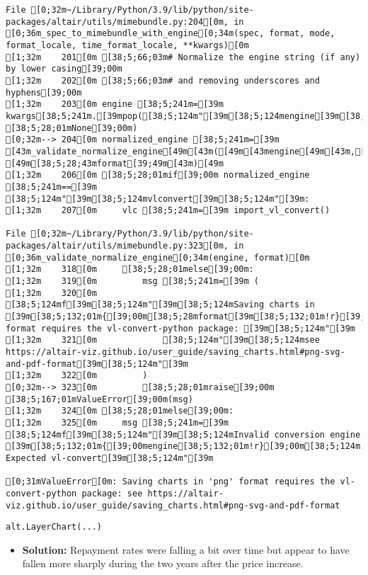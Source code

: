 \documentclass[
  letterpaper,
  DIV=11,
  numbers=noendperiod]{scrartcl}
\providecommand{\tightlist}{%
  \setlength{\itemsep}{0pt}\setlength{\parskip}{0pt}}\usepackage{longtable,booktabs,array}
\begin{document}
\begin{verbatim}
File [0;32m~/Library/Python/3.9/lib/python/site-packages/altair/utils/mimebundle.py:204[0m, in [0;36m_spec_to_mimebundle_with_engine[0;34m(spec, format, mode, format_locale, time_format_locale, **kwargs)[0m
[1;32m    201[0m [38;5;66;03m# Normalize the engine string (if any) by lower casing[39;00m
[1;32m    202[0m [38;5;66;03m# and removing underscores and hyphens[39;00m
[1;32m    203[0m engine [38;5;241m=[39m kwargs[38;5;241m.[39mpop([38;5;124m"[39m[38;5;124mengine[39m[38;5;124m"[39m, [38;5;28;01mNone[39;00m)
[0;32m--> 204[0m normalized_engine [38;5;241m=[39m [43m_validate_normalize_engine[49m[43m([49m[43mengine[49m[43m,[49m[43m [49m[38;5;28;43mformat[39;49m[43m)[49m
[1;32m    206[0m [38;5;28;01mif[39;00m normalized_engine [38;5;241m==[39m [38;5;124m"[39m[38;5;124mvlconvert[39m[38;5;124m"[39m:
[1;32m    207[0m     vlc [38;5;241m=[39m import_vl_convert()

File [0;32m~/Library/Python/3.9/lib/python/site-packages/altair/utils/mimebundle.py:323[0m, in [0;36m_validate_normalize_engine[0;34m(engine, format)[0m
[1;32m    318[0m     [38;5;28;01melse[39;00m:
[1;32m    319[0m         msg [38;5;241m=[39m (
[1;32m    320[0m             [38;5;124mf[39m[38;5;124m"[39m[38;5;124mSaving charts in [39m[38;5;132;01m{[39;00m[38;5;28mformat[39m[38;5;132;01m!r}[39;00m[38;5;124m format requires the vl-convert-python package: [39m[38;5;124m"[39m
[1;32m    321[0m             [38;5;124m"[39m[38;5;124msee https://altair-viz.github.io/user_guide/saving_charts.html#png-svg-and-pdf-format[39m[38;5;124m"[39m
[1;32m    322[0m         )
[0;32m--> 323[0m         [38;5;28;01mraise[39;00m [38;5;167;01mValueError[39;00m(msg)
[1;32m    324[0m [38;5;28;01melse[39;00m:
[1;32m    325[0m     msg [38;5;241m=[39m [38;5;124mf[39m[38;5;124m"[39m[38;5;124mInvalid conversion engine [39m[38;5;132;01m{[39;00mengine[38;5;132;01m!r}[39;00m[38;5;124m. Expected vl-convert[39m[38;5;124m"[39m

[0;31mValueError[0m: Saving charts in 'png' format requires the vl-convert-python package: see https://altair-viz.github.io/user_guide/saving_charts.html#png-svg-and-pdf-format
\end{verbatim}

\begin{verbatim}
alt.LayerChart(...)
\end{verbatim}

\begin{itemize}
\tightlist
\item
  \textbf{Solution:} Repayment rates were falling a bit over time but
  appear to have fallen more sharply during the two years after the
  price increase.
\end{itemize}
\end{document}
